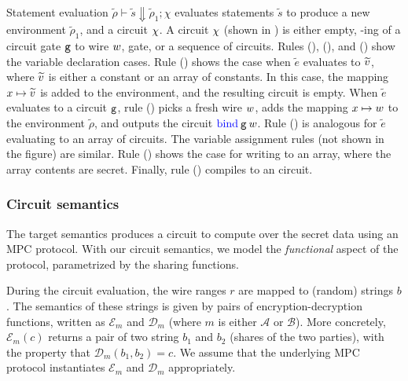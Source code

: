 Statement evaluation $\widetilde{\rho} \vdash \widetilde{s} \Downarrow
\widetilde{\rho}_{1}; \chi$ evaluates statements $\widetilde{s}$ to produce a new
environment $\widetilde{\rho}_{1}$, and a circuit $\chi$. A circuit $\chi$ (shown
in ) is either empty, -ing of a
circuit gate $\mathtt{g}$ to wire $w$,  gate, or a sequence of
circuits. Rules ({}), ({}), and
({}) show the variable declaration cases. Rule
({}) shows the case when $\widetilde{e}$ evaluates to
$\widetilde{v}$, where $\widetilde{v}$ is either a constant or an
array of constants. In this case, the mapping $x \mapsto
\widetilde{v}$ is added to the environment, and the resulting circuit
is empty. When 
$\widetilde{e}$ evaluates to a circuit $\mathtt{g}$, rule
({}) picks a fresh wire $w$, adds the mapping $x \mapsto w$
to the environment $\widetilde{\rho}$, and outputs the circuit
$\kw{bind}\:\gate\:\wire$. Rule ({}) is analogous for
$\widetilde{e}$ evaluating to an array of circuits. The variable
assignment rules (not shown in the figure) are similar. Rule
({}) shows the case for writing to an array, where the
array contents are secret. Finally, rule ({}) compiles to an
 circuit.


\subsubsection*{Circuit semantics} The target semantics produces a
circuit to compute over the secret data using an MPC protocol. With
our circuit semantics, we model the \emph{functional} aspect of the
protocol, parametrized by the sharing functions.

During the circuit evaluation, the wire ranges $r$ are
mapped to (random) strings $b$. The semantics of these strings is
given by pairs of encryption-decryption functions, written as
$\mathcal{E}_{m}$ and $\mathcal{D}_{m}$ (where $m$ is either
$\mathcal{A}$ or $\mathcal{B}$). More concretely,
$\mathcal{E}_{m}(c)$ returns a pair of two string $b_{1}$ and $b_{2}$
(shares of the two parties), with the property that
$\mathcal{D}_{m}(b_{1}, b_{2}) = c$. We assume that the underlying MPC
protocol instantiates $\mathcal{E}_{m}$ and $\mathcal{D}_{m}$
appropriately.

